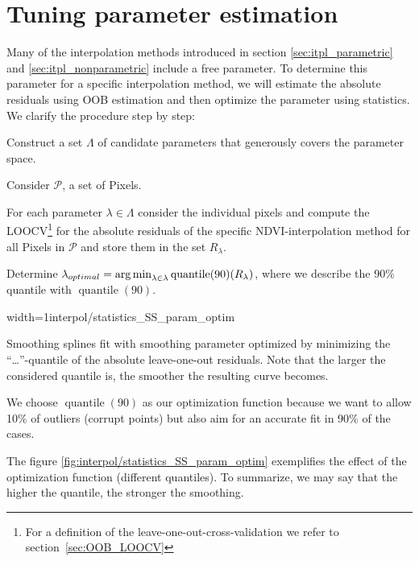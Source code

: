 \section{Tuning parameter estimation}{ \label{sec:itpl_param_est}
	Many of the interpolation methods introduced in section \ref{sec:itpl_parametric} and \ref{sec:itpl_nonparametric} include a free parameter. To determine this parameter for a specific interpolation method, we will estimate the absolute residuals using OOB estimation and then optimize the parameter using statistics. We clarify the procedure step by step:	
	\begin{Nenumerate}
		\item Construct a set $\Lambda$ of candidate parameters that generously covers the parameter space.
		\item Consider $\mathcal{P}$, a set of Pixels.
		\item For each parameter $\lambda \in \Lambda$ consider the individual pixels and compute the LOOCV\footnote{For a definition of the leave-one-out-cross-validation we refer to section~\ref{sec:OOB_LOOCV}} for the absolute residuals of the specific NDVI-interpolation method for all Pixels in $\mathcal{P}$ and store them in the set $R_\lambda$. 
		\item Determine $\lambda_{optimal} = \operatorname*{arg\, min}_{\lambda\in\lambda}\operatorname{quantile}(90)(R_\lambda)$, where we describe the 90\% quantile with $\operatorname{quantile}(90)$.
	\end{Nenumerate}

	\begin{my_figure}[h]{width=1\textwidth}{interpol/statistics_SS_param_optim}
		\caption{Smoothing splines fit with smoothing parameter optimized by minimizing the ``\dots''-quantile of the absolute leave-one-out residuals. Note that the larger the considered quantile is, the smoother the resulting curve becomes.}
		\label{fig:interpol/statistics_SS_param_optim}
	\end{my_figure}

	We choose $\operatorname{quantile}(90)$ as our optimization function because we want to allow 10\% of outliers (corrupt points) but also aim for an accurate fit in 90\% of the cases.  
	
	The figure \ref{fig:interpol/statistics_SS_param_optim} exemplifies the effect of the optimization function (different quantiles). To summarize, we may say that the higher the quantile, the stronger the smoothing. 
}


